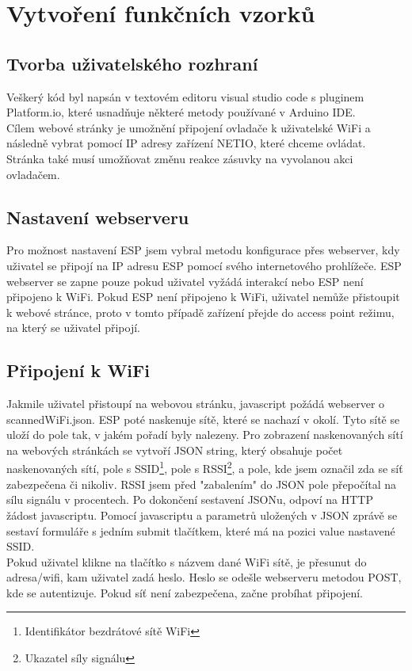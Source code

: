 \documentclass[a4paper, 12pt]{report}
\begin{document}


	\chapter{Vytvoření funkčních vzorků}
		\section{Tvorba uživatelského rozhraní}
		 	Veškerý kód byl napsán v textovém editoru visual studio code s pluginem Platform.io, které usnadňuje některé metody používané v Arduino IDE.\\
		 	Cílem webové stránky je umožnění připojení ovladače k uživatelské WiFi a následně vybrat pomocí IP adresy zařízení NETIO, které chceme ovládat. Stránka také musí umožňovat změnu reakce zásuvky na vyvolanou akci ovladačem.
			\section{Nastavení webserveru}
		 		Pro možnost nastavení ESP jsem vybral metodu konfigurace přes webserver, kdy uživatel se připojí na IP adresu ESP pomocí svého internetového prohlížeče. ESP webserver se zapne pouze pokud uživatel vyžádá interakcí nebo ESP není připojeno k WiFi. Pokud ESP není připojeno k WiFi, uživatel nemůže přistoupit k webové stránce, proto v tomto případě zařízení přejde do access point režimu, na který se uživatel připojí.
			\section{Připojení k WiFi}
				Jakmile uživatel přistoupí na webovou stránku, javascript požádá webserver o scannedWiFi.json. ESP poté naskenuje sítě, které se nachazí v okolí. Tyto sítě se uloží do pole tak, v jakém pořadí byly nalezeny. Pro zobrazení naskenovaných sítí na webových stránkách se vytvoří JSON string, který obsahuje počet naskenovaných sítí, pole s SSID\footnote{Identifikátor bezdrátové sítě WiFi}, pole s RSSI\footnote{Ukazatel síly signálu}, a pole, kde jsem označil zda se síť zabezpečena či nikoliv. RSSI jsem před "zabalením" do JSON pole přepočítal na sílu signálu v procentech. Po dokončení sestavení JSONu, odpoví na HTTP žádost javascriptu. Pomocí javascriptu a parametrů uložených v JSON zprávě se sestaví formuláře s jedním submit tlačítkem, které má na pozici value nastavené SSID.\\
				Pokud uživatel klikne na tlačítko s názvem dané WiFi sítě, je přesunut do adresa/wifi, kam uživatel zadá heslo. Heslo se odešle webserveru metodou POST, kde se autentizuje. Pokud síť není zabezpečena, začne probíhat připojení.
\end{document}
